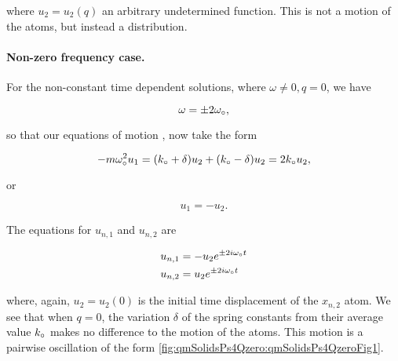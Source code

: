 {where $u_2 = u_2(q)$ an arbitrary undetermined function.  This is not a motion of the atoms, but instead a distribution.

%
%
%
%

\paragraph{Non-zero frequency case.}

For the non-constant time dependent solutions, where $\omega \ne 0, q = 0$, we have

\begin{dmath}\label{eqn:condensedMatterProblemSet4Problem2:560}
\omega = \pm 2 \omega_\nought,
\end{dmath}

so that our equations of motion , now take the form

\begin{dmath}\label{eqn:condensedMatterProblemSet4Problem2:640}
-m \omega_\nought^2 u_1
=
(k_\nought + \delta)
u_2
+ (k_\nought - \delta)
u_2
=
2 k_\nought
u_2,
\end{dmath}

or

\begin{dmath}\label{eqn:condensedMatterProblemSet4Problem2:660}
u_1 = -u_2.
\end{dmath}

The equations for $u_{n, 1}$ and $u_{n, 2}$ are

\begin{dmath}\label{eqn:condensedMatterProblemSet4Problem2:600}
\begin{aligned}
u_{n, 1} &= -u_2 e^{ \pm 2 i \omega_\nought t } \\
u_{n, 2} &= u_2 e^{ \pm 2 i \omega_\nought t }
\end{aligned}
\end{dmath}

where, again, $u_2 = u_2(0)$ is the initial time displacement of the $x_{n, 2}$ atom.  We see that when $q = 0$, the variation $\delta$ of the spring constants from their average value $k_\circ$ makes no difference to the motion of the atoms.  This motion is a pairwise oscillation of the form \cref{fig:qmSolidsPs4Qzero:qmSolidsPs4QzeroFig1}.

}

